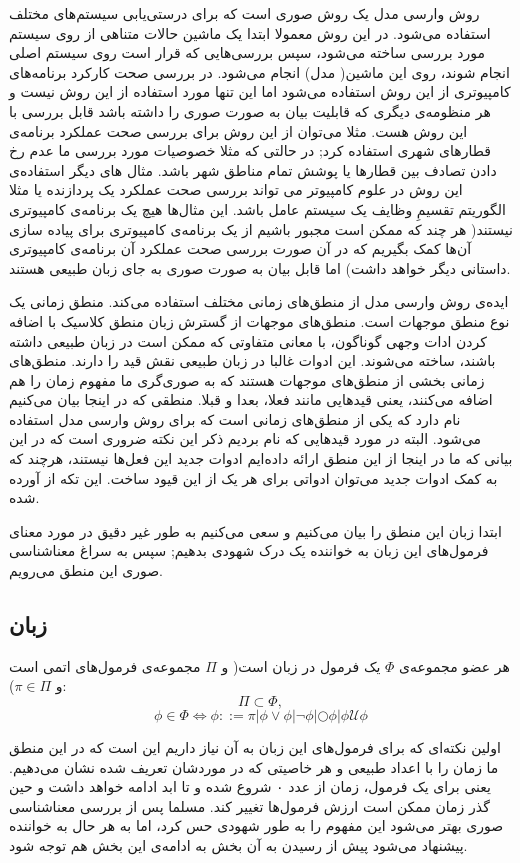 روش وارسی مدل یک روش صوری است که برای درستی‌یابی سیستم‌های مختلف استفاده می‌شود. در این روش معمولا ابتدا یک ماشین حالات متناهی از روی سیستم مورد بررسی ساخته می‌شود، سپس بررسی‌هایی که قرار است روی سیستم اصلی انجام شوند، روی این ماشین( مدل) انجام می‌شود. در بررسی صحت کارکرد برنامه‌های کامپیوتری از این روش استفاده می‌شود اما این تنها مورد استفاده از این روش نیست و هر منظومه‌ی دیگری که قابلیت بیان به صورت صوری را داشته باشد قابل بررسی با این روش هست. مثلا می‌توان از این روش برای بررسی صحت عملکرد برنامه‌ی قطارهای شهری استفاده کرد; در حالتی که مثلا خصوصیات مورد بررسی ما عدم رخ دادن تصادف بین قطارها یا پوشش تمام  مناطق شهر باشد. مثال های دیگر استفاده‌ی این روش در علوم کامپیوتر می تواند بررسی صحت عملکرد یک پردازنده یا مثلا الگوریتم تقسیمِ وظایف یک سیستم عامل باشد. این مثال‌ها هیچ یک برنامه‌ی کامپیوتری نیستند( هر چند که ممکن است مجبور باشیم از یک برنامه‌ی کامپیوتری برای پیاده سازی آن‌ها کمک بگیریم که در آن صورت بررسی صحت عملکرد آن برنامه‌ی کامپیوتری داستانی دیگر خواهد داشت) اما قابل بیان به صورت صوری به جای زبان طبیعی هستند.

ایده‌ی روش وارسی مدل از منطق‌های زمانی مختلف استفاده می‌کند. منطق زمانی یک نوع منطق موجهات است. منطق‌های موجهات از گسترش زبان منطق کلاسیک با اضافه کردن ادات وجهی گوناگون، با معانی متفاوتی که ممکن است در زبان طبیعی داشته باشند، ساخته می‌شوند. این ادوات غالبا در زبان طبیعی نقش قید را دارند. منطق‌های زمانی بخشی از منطق‌های موجهات هستند که به صوری‌گری ما مفهوم زمان را هم اضافه می‌کنند، یعنی قیدهایی مانند فعلا، بعدا و قبلا. منطقی که در اینجا بیان می‌کنیم  نام دارد که یکی از منطق‌های زمانی است که برای روش وارسی مدل استفاده می‌شود. البته در مورد قیدهایی که نام بردیم ذکر این نکته ضروری است که در این بیانی که ما در اینجا از این منطق ارائه داده‌ایم ادوات جدید این فعل‌ها نیستند، هرچند که به کمک ادوات جدید می‌توان ادواتی برای هر یک از این قیود ساخت.
این تکه از \cite{buchi} آورده شده.

ابتدا زبان این منطق را بیان می‌کنیم و سعی می‌کنیم به طور غیر دقیق در مورد معنای فرمول‌های این زبان به خواننده یک درک شهودی بدهیم; سپس به سراغ معناشناسی صوری این منطق می‌رویم.

\subsection{زبان }
\begin{defn}
	هر عضو مجموعه‌ی $\Phi$ یک فرمول در زبان  است( و $\Pi$ مجموعه‌ی فرمول‌های اتمی است و $\pi \in \Pi$):
	$$
	\Pi \subset \Phi,
	$$
	$$
	\phi \in \Phi \Leftrightarrow
	\phi ::= \pi | \phi \lor \phi |
	\neg \phi |
	\bigcirc \phi |
	\phi \mathcal{U}\phi 
$$	
	
\end{defn}
اولین نکته‌ای که برای فرمول‌های این زبان به آن نیاز داریم این است که در این منطق ما زمان را با اعداد طبیعی و هر خاصیتی که در موردشان تعریف شده نشان می‌دهیم. یعنی برای یک فرمول، زمان از عدد ۰ شروع شده و تا ابد ادامه خواهد داشت و حین گذر زمان ممکن است ارزش فرمول‌ها تغییر کند. مسلما پس از بررسی معناشناسی صوری بهتر می‌شود این مفهوم را به طور شهودی حس کرد، اما به هر حال به خواننده پیشنهاد می‌شود پیش از رسیدن به آن بخش به ادامه‌ی این بخش هم توجه شود. 

